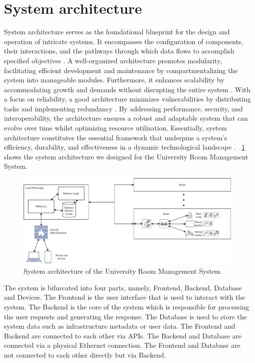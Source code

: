 \documentclass[article,onecolumn]{IEEEtran}
\begin{document}
\section{System architecture}
	System architecture serves as the foundational blueprint for the design and operation of intricate systems. It encompasses the configuration of components, their interactions, and the pathways through which data flows to accomplish specified objectives \cite{steen2007distributed}. A well-organized architecture promotes modularity, facilitating efficient development and maintenance by compartmentalizing the system into manageable modules. Furthermore, it enhances scalability by accommodating growth and demands without disrupting the entire system \cite{kotseruba2016review}. With a focus on reliability, a good architecture minimizes vulnerabilities by distributing tasks and implementing redundancy \cite{steen2007distributed}. By addressing performance, security, and interoperability, the architecture ensures a robust and adaptable system that can evolve over time whilst optimizing resource utilization. Essentially, system architecture constitutes the essential framework that underpins a system's efficiency, durability, and effectiveness in a dynamic technological landscape \cite{kotseruba2016review}. \figurename~\ref{fig:systemarchitecture} shows the system architecture we designed for the University Room Management System.


	\begin{figure}[H]
		\centering
		\includegraphics[width=1\textwidth]{Figures/SystemArchitecture.pdf}
		\caption{System architecture of the University Room Management System}
		\label{fig:systemarchitecture}
	\end{figure}

	The system is bifurcated into four parts, namely, Frontend, Backend, Database and Devices. The Frontend is the user interface that is used to interact with the system. The Backend is the core of the system which is responsible for processing the user requests and generating the response. The Database is used to store the system data such as infrastructure metadata or user data. The Frontend and Backend are connected to each other via APIs. The Backend and Database are connected via a physical Ethernet connection. The Frontend and Database are not connected to each other directly but via Backend. 
\end{document}

